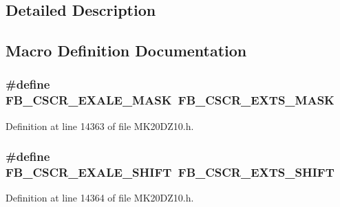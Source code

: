 \subsection{Detailed Description}


\subsection{Macro Definition Documentation}
\subsubsection[{\texorpdfstring{F\+B\+\_\+\+C\+S\+C\+R\+\_\+\+E\+X\+A\+L\+E\+\_\+\+M\+A\+SK}{FB_CSCR_EXALE_MASK}}]{\setlength{\rightskip}{0pt plus 5cm}\#define F\+B\+\_\+\+C\+S\+C\+R\+\_\+\+E\+X\+A\+L\+E\+\_\+\+M\+A\+SK~{\bf F\+B\+\_\+\+C\+S\+C\+R\+\_\+\+E\+X\+T\+S\+\_\+\+M\+A\+SK}}\hypertarget{group___backward___compatibility___symbols_ga330f19347b3218e6273f9b4841b5ec88}{}\label{group___backward___compatibility___symbols_ga330f19347b3218e6273f9b4841b5ec88}


Definition at line 14363 of file M\+K20\+D\+Z10.\+h.

\subsubsection[{\texorpdfstring{F\+B\+\_\+\+C\+S\+C\+R\+\_\+\+E\+X\+A\+L\+E\+\_\+\+S\+H\+I\+FT}{FB_CSCR_EXALE_SHIFT}}]{\setlength{\rightskip}{0pt plus 5cm}\#define F\+B\+\_\+\+C\+S\+C\+R\+\_\+\+E\+X\+A\+L\+E\+\_\+\+S\+H\+I\+FT~{\bf F\+B\+\_\+\+C\+S\+C\+R\+\_\+\+E\+X\+T\+S\+\_\+\+S\+H\+I\+FT}}\hypertarget{group___backward___compatibility___symbols_gac912eb6a0ffed6c2d88c59e002632be9}{}\label{group___backward___compatibility___symbols_gac912eb6a0ffed6c2d88c59e002632be9}


Definition at line 14364 of file M\+K20\+D\+Z10.\+h.

